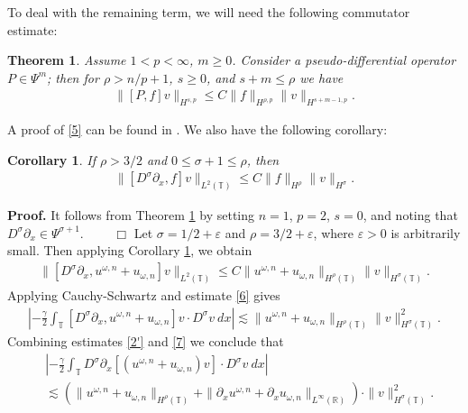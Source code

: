 \documentclass[12pt,reqno]{amsart}
\newcommand{\rr}{\mathbb{R}}
\newcommand{\p}{\partial}
\newcommand{\ci}{\mathbb{T}}
\newcommand{\ee}{\varepsilon}
\theoremstyle{plain}  %
\newtheorem{theorem}{Theorem}
\newtheorem{corollary}{Corollary}
\theoremstyle{definition}
\begin{document}
To deal with the remaining term, we will need the following commutator
estimate:
\begin{theorem}
	\label{thm10}
	Assume $1<p<\infty$, $m \ge 0$. Consider a pseudo-differential operator $P
	\in \Psi^m$; then for $\rho >n/p + 1$, $s \ge 0$, and $s+m \le \rho$ we
	have
	\begin{equation}
		\begin{split}
			\|[P,f]v\|_{H^{s,p}} \le C \|f\|_{H^{\rho,p}}
			\|v\|_{H^{s+m-1,p}}.
			\label{5}
		\end{split}
	\end{equation}
\end{theorem}
%
A proof of \eqref{5} can be found in \cite{t2}. We also have the following
corollary:
\begin{corollary}
	\label{cor1}
If $\rho > 3/2$ and $0 \le \sigma + 1 \le \rho$, then
\begin{equation}
	\begin{split}
		\|[D^\sigma \p_x ,f]v\|_{L^2(\ci)} \le C \|f\|_{H^\rho} \|v\|_{H^\sigma}.
		\label{15}
	\end{split}
\end{equation}
\end{corollary}
{\bf Proof.} It follows from Theorem \ref{thm10} by setting $n=1$, $p=2$,
$s=0$, and noting  that $D^\sigma \p_x \in
\Psi^{\sigma + 1}$. $\qquad \Box$
\vskip0.1in
Let $\sigma = 1/2 + \ee$ and $\rho = 3/2 + \ee$, where $\ee > 0$ is
arbitrarily small. Then
applying Corollary \ref{cor1}, we obtain
\begin{equation}
	\begin{split}
		\|[D^\sigma \p_x, u^{\omega,n} + u_{\omega,n}]v\|_{L^2(\ci)} \le C \|u^{\omega,n} + u_{\omega,n}
		\|_{H^{\rho}(\ci)} \|v\|_{H^\sigma(\ci)}.
		\label{6}
	\end{split}
\end{equation}
Applying Cauchy-Schwartz and estimate \eqref{6} gives
\begin{equation}
	\begin{split}
		\left | -\frac{\gamma}{2} \int_{\ci} [D^\sigma \p_x , u^{\omega,n} + u_{\omega,n}]v
		\cdot D^\sigma v \ dx \right | \lesssim \|u^{\omega,n} +
		u_{\omega,n}\|_{H^{\rho}(\ci)} \|v\|_{H^\sigma(\ci)}^2.
		\label{7}
	\end{split}
\end{equation}
Combining estimates \eqref{2'} and \eqref{7} we conclude that
\begin{equation}
	\begin{split}
		& \left | -\frac{\gamma}{2} \int_{\ci} D^\sigma \p_x \left[ \left( u^{\omega,n} + u_{\omega,n}
		\right)v \right]  \cdot D^\sigma v \ dx \right |
		\\
		& \lesssim (\|u^{\omega,n} + u_{\omega,n}\|_{H^{\rho}(\ci)} 
		 + \|\p_x u^{\omega,n} +
		\p_x u_{\omega,n}\|_{L^\infty(\rr)} ) \cdot \|v\|_{H^\sigma(\ci)}^2.
		\label{8}
	\end{split}
\end{equation}
\end{document}
